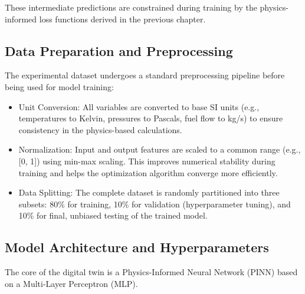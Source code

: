 \documentclass[
  12pt,
  oneside,
  a4paper,
  english,
  brazil]{abntex2}
\providecommand{\tightlist}{%
  \setlength{\itemsep}{0pt}\setlength{\parskip}{0pt}}
\begin{document}
These intermediate predictions are constrained during training by the
physics-informed loss functions derived in the previous chapter.

\subsection{Data Preparation and
Preprocessing}\label{data-preparation-and-preprocessing}

The experimental dataset undergoes a standard preprocessing pipeline
before being used for model training:

\begin{itemize}
\tightlist
\item
  Unit Conversion: All variables are converted to base SI units (e.g.,
  temperatures to Kelvin, pressures to Pascals, fuel flow to kg/s) to
  ensure consistency in the physics-based calculations.
\item
  Normalization: Input and output features are scaled to a common range
  (e.g., {[}0, 1{]}) using min-max scaling. This improves numerical
  stability during training and helps the optimization algorithm
  converge more efficiently.
\item
  Data Splitting: The complete dataset is randomly partitioned into
  three subsets: 80\% for training, 10\% for validation (hyperparameter
  tuning), and 10\% for final, unbiased testing of the trained model.
\end{itemize}

\subsection{Model Architecture and
Hyperparameters}\label{model-architecture-and-hyperparameters}

The core of the digital twin is a Physics-Informed Neural Network (PINN)
based on a Multi-Layer Perceptron (MLP).
\end{document}
